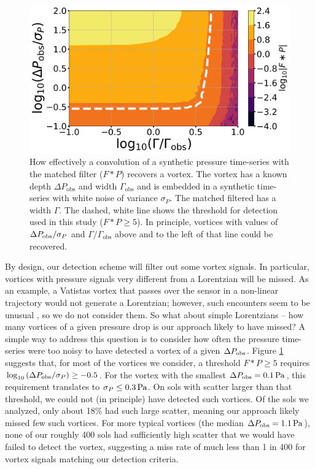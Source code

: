 \documentclass{aastex63}
\begin{document}
\begin{figure}
    \centering
    \includegraphics[width=\textwidth]{figures/vortex_recovery.png}
    \caption{How effectively a convolution of a synthetic pressure time-series with the matched filter ($F \ast P$) recovers a vortex. The vortex has a known depth $\Delta P_\text{obs}$ and width $\Gamma_\text{obs}$ and is embedded in a synthetic time-series with white noise of variance $\sigma_P$. The matched filtered has a width $\Gamma$. The dashed, white line shows the threshold for detection used in this study ($F \ast P \geq 5$). In principle, vortices with values of $\Delta P_{\rm obs}/\sigma_P$ and $\Gamma/\Gamma_\text{obs}$ above and to the left of that line could be recovered.}
    \label{fig:vortex_recovery}
\end{figure}

By design, our detection scheme will filter out some vortex signals. In particular, vortices with pressure signals very different from a Lorentzian will be missed. As an example, a Vatistas vortex that passes over the sensor in a non-linear trajectory would not generate a Lorentzian; however, such encounters seem to be unusual \citep{LORENZ20151}, so we do not consider them. So what about simple Lorentzians -- how many vortices of a given pressure drop is our approach likely to have missed? A simple way to address this question is to consider how often the pressure time-series were too noisy to have detected a vortex of a given $\Delta P_{\rm obs}$. Figure \ref{fig:vortex_recovery} suggests that, for most of the vortices we consider, a threshold $F \ast P \ge 5$ requires $\log_{10} \left( \Delta P_{\rm obs}/\sigma_P \right) \ge -0.5$. For the vortex with the smallest $\Delta P_{\rm obs} = 0.1\,{\rm Pa}$, this requirement translates to $\sigma_P \le 0.3\,{\rm Pa}$. On sols with scatter larger than that threshold, we could not (in principle) have detected such vortices. Of the sols we analyzed, only about 18\% had such large scatter, meaning our approach likely missed few such vortices. For more typical vortices (the median $\Delta P_{\rm obs} = 1.1\,{\rm Pa}$), none of our roughly 400 sols had sufficiently high scatter that we would have failed to detect the vortex, suggesting a miss rate of much less than 1 in 400 for vortex signals matching our detection criteria.
\end{document}
